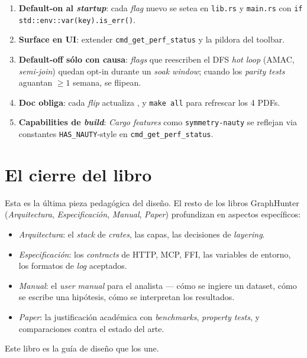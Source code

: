 \begin{enumerate}
    \item \textbf{Default-on al \emph{startup}}: cada \emph{flag}
    nuevo se setea en \texttt{lib.rs} y \texttt{main.rs} con
    \texttt{if std::env::var(key).is\_err()}.
    \item \textbf{Surface en UI}: extender
    \texttt{cmd\_get\_perf\_status} y la pildora del toolbar.
    \item \textbf{Default-off sólo con causa}: \emph{flags} que
    reescriben el DFS \emph{hot loop} (AMAC, \emph{semi-join})
    quedan opt-in durante un \emph{soak window}; cuando los
    \emph{parity tests} aguantan \(\geq 1\) semana, se flipean.
    \item \textbf{Doc obliga}: cada \emph{flip} actualiza
    , 
    y \texttt{make all} para refrescar los 4 PDFs.
    \item \textbf{Capabilities de \emph{build}}: \emph{Cargo features}
    como \texttt{symmetry-nauty} se reflejan via constantes
    \texttt{HAS\_NAUTY}-style en \texttt{cmd\_get\_perf\_status}.
\end{enumerate}

\section{El cierre del libro}

Esta es la última pieza pedagógica del diseño. El resto de los libros
GraphHunter (\emph{Arquitectura}, \emph{Especificación}, \emph{Manual},
\emph{Paper}) profundizan en aspectos específicos:

\begin{itemize}
    \item \emph{Arquitectura}: el \emph{stack} de \emph{crates}, las
    capas, las decisiones de \emph{layering}.
    \item \emph{Especificación}: los \emph{contracts} de HTTP, MCP,
    FFI, las variables de entorno, los formatos de \emph{log} aceptados.
    \item \emph{Manual}: el \emph{user manual} para el analista ---
    cómo se ingiere un dataset, cómo se escribe una hipótesis, cómo se
    interpretan los resultados.
    \item \emph{Paper}: la justificación académica con
    \emph{benchmarks}, \emph{property tests}, y comparaciones contra
    el estado del arte.
\end{itemize}

Este libro es la guía de diseño que los une.
